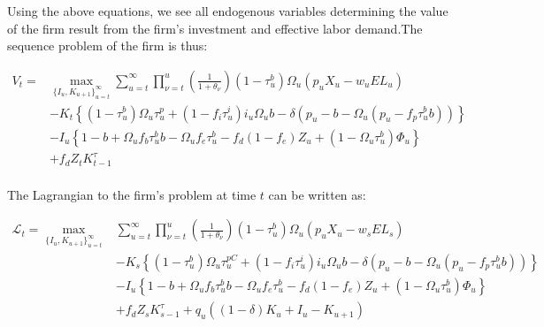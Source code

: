 Using the above equations, we see all endogenous variables determining the value of the firm result from the firm's investment and effective labor demand.The sequence problem of the firm is thus: 

 \begin{equation}
\label{eqn:firm_seq_prob}
\begin{split}
V_{t} = &   \max_{\{I_{u},K_{u+1}\}^{\infty}_{u=t}}   \sum_{u=t}^{\infty} \prod_{\nu=t}^{u}\left(\frac{1}{1+\theta_{\nu}}\right) (1-\tau^{b}_{u})\Omega_{u}(p_{u}X_{u}-w_{u}EL_{u})  \\ 
 & - K_{t} \left\{(1-\tau^{b}_{u})\Omega_{u}\tau^{p}_{u}+(1-f_{i}\tau^{i}_{u})i_{u}\Omega_{u}b-\delta(p_{u}-b-\Omega_{u}(p_{u}-f_{p}\tau^{b}_{u}b))\right\}  \\
 & - I_{u}\left\{1-b+\Omega_{u}f_{b}\tau^{b}_{u}b-\Omega_{u}f_{e}\tau^{b}_{u} - f_{d}(1-f_{e})Z_{u} + (1-\Omega_{u}\tau^{b}_{u})\Phi_{u}\right\} \\
 &  + f_{d}Z_{t}K^{\tau}_{t-1} \\
\end{split}
\end{equation}

The Lagrangian to the firm's problem at time $t$ can be written as:

 \begin{equation}
\label{eqn:lagrangian}
\begin{split}
\mathcal{L}_{t} = \max_{\{I_{u},K_{u+1}\}^{\infty}_{u=t}} &  \sum_{u=t}^{\infty} \prod_{\nu=t}^{u}\left(\frac{1}{1+\theta_{\nu}}\right) (1-\tau^{b}_{u})\Omega_{u}(p_{u}X_{u}-w_{s}EL_{s})  \\ 
 & - K_{s} \left\{(1-\tau^{b}_{u})\Omega_{u}\tau^{pC}_{u}+(1-f_{i}\tau^{i}_{u})i_{u}\Omega_{u}b-\delta(p_{u}-b-\Omega_{u}(p_{u}-f_{p}\tau^{b}_{u}b))\right\}  \\
 & - I_{u}\left\{1-b+\Omega_{u}f_{b}\tau^{b}_{u}b-\Omega_{u}f_{e}\tau^{b}_{u} - f_{d}(1-f_{e})Z_{u} + (1-\Omega_{u}\tau^{b}_{u})\Phi_{u}\right\} \\
 &  + f_{d}Z_{s}K^{\tau}_{s-1} + q_{u}((1-\delta)K_{u} + I_{u}-K_{u+1})\\
\end{split}
\end{equation}

